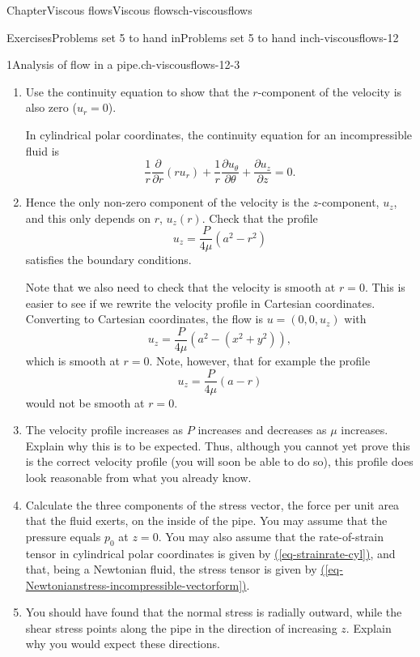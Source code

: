 \documentclass[oneside,10pt,]{book}
\newcommand{\xreffont}{\relax}
\numberwithin{equation}{section}
\newcommand{\pd}[2]{\frac{\partial#1}{\partial#2}}
\begin{document}
\begin{chapterptx}{Chapter}{Viscous flows}{}{Viscous flows}{}{}{ch-viscousflows}
\begin{exercises-section}{Exercises}{Problems set 5 to hand in}{}{Problems set 5 to hand in}{}{}{ch-viscousflows-12}
\begin{divisionexercise}{1}{Analysis of flow in a pipe.}{}{ch-viscousflows-12-3}
\begin{enumerate}[font=\bfseries,label=(\alph*),ref=\alph*]
\item{}Use the continuity equation to show that the \(r\)-component of the velocity is also zero (\(u_r=0\)).%
\par
In cylindrical polar coordinates, the continuity equation for an incompressible fluid is%
\begin{equation*}
\frac{1}{r}\pd{}{r}(ru_r)+\frac{1}{r}\pd{u_\theta}{\theta}+\pd{u_z}{z}=0.
\end{equation*}
%
\item{}Hence the only non-zero component of the velocity is the \(z\)-component, \(u_z\), and this only depends on \(r\), \(u_z(r)\). Check that the profile%
\begin{equation*}
u_z=\frac{P}{4\mu}\left(a^2-r^2\right)
\end{equation*}
satisfies the boundary conditions.%
\par
Note that we also need to check that the velocity is smooth at \(r=0\). This is easier to see if we rewrite the velocity profile in Cartesian coordinates. Converting to Cartesian coordinates, the flow is \(u=(0,0,u_z)\) with%
\begin{equation*}
u_z=\frac{P}{4\mu}\left(a^2-(x^2+y^2)\right),
\end{equation*}
which is smooth at \(r=0\). Note, however, that for example the profile%
\begin{equation*}
u_z=\frac{P}{4\mu}\left(a-r\right)
\end{equation*}
would not be smooth at \(r=0\).%
\item{}The velocity profile increases as \(P\) increases and decreases as \(\mu\) increases. Explain why this is to be expected. Thus, although you cannot yet prove this is the correct velocity profile (you will soon be able to do so), this profile does look reasonable from what you already know.%
\item{}Calculate the three components of the stress vector, the force per unit area that the fluid exerts, on the inside of the pipe. You may assume that the pressure equals \(p_0\) at \(z=0\). You may also assume that the rate-of-strain tensor in cylindrical polar coordinates is given by \hyperref[eq-strainrate-cyl]{({\xreffont\ref{eq-strainrate-cyl}})}, and that, being a Newtonian fluid, the stress tensor is given by \hyperref[eq-Newtonianstress-incompressible-vectorform]{({\xreffont\ref{eq-Newtonianstress-incompressible-vectorform}})}.%
\item{}You should have found that the normal stress is radially outward, while the shear stress points along the pipe in the direction of increasing \(z\). Explain why you would expect these directions.%

\end{enumerate}
\end{divisionexercise}
\end{exercises-section}
\end{chapterptx}
\end{document}
